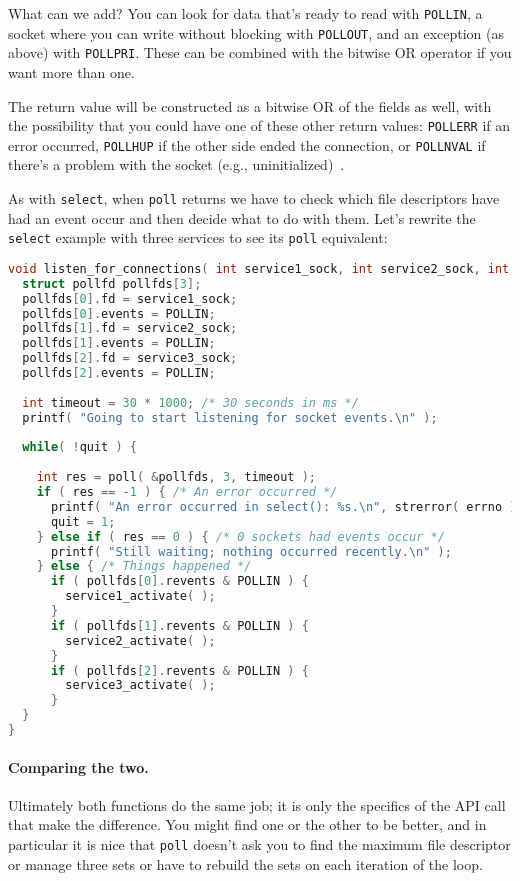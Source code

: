 What can we add? You can look for data that's ready to read with \texttt{POLLIN}, a socket where you can write without blocking with \texttt{POLLOUT}, and an exception (as above) with \texttt{POLLPRI}. These can be combined with the bitwise OR operator if you want more than one.

The return value will be constructed as a bitwise OR of the fields as well, with the possibility that you could have one of these other return values: \texttt{POLLERR} if an error occurred, \texttt{POLLHUP} if the other side ended the connection, or \texttt{POLLNVAL} if there's a problem with the socket (e.g., uninitialized)~\cite{getaddrinfo}.

As with \texttt{select}, when \texttt{poll} returns we have to check which file descriptors have had an event occur and then decide what to do with them. Let's rewrite the \texttt{select} example with three services to see its \texttt{poll} equivalent:

\begin{lstlisting}[language=C]
void listen_for_connections( int service1_sock, int service2_sock, int service3_sock ) {
  struct pollfd pollfds[3];
  pollfds[0].fd = service1_sock;
  pollfds[0].events = POLLIN;
  pollfds[1].fd = service2_sock;
  pollfds[1].events = POLLIN;
  pollfds[2].fd = service3_sock;
  pollfds[2].events = POLLIN;
 
  int timeout = 30 * 1000; /* 30 seconds in ms */ 
  printf( "Going to start listening for socket events.\n" );
  
  while( !quit ) {
    
    int res = poll( &pollfds, 3, timeout );
    if ( res == -1 ) { /* An error occurred */
      printf( "An error occurred in select(): %s.\n", strerror( errno ) );
      quit = 1;
    } else if ( res == 0 ) { /* 0 sockets had events occur */
      printf( "Still waiting; nothing occurred recently.\n" );
    } else { /* Things happened */
      if ( pollfds[0].revents & POLLIN ) {
        service1_activate( ); 
      }
      if ( pollfds[1].revents & POLLIN ) {
        service2_activate( ); 
      }
      if ( pollfds[2].revents & POLLIN ) {
        service3_activate( ); 
      }
  }
}
\end{lstlisting}


\paragraph{Comparing the two.}
Ultimately both functions do the same job; it is only the specifics of the API call that make the difference. You might find one or the other to be better, and in particular it is nice that \texttt{poll} doesn't ask you to find the maximum file descriptor or manage three sets or have to rebuild the sets on each iteration of the loop.

